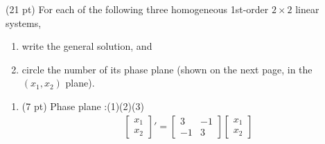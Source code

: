 (21 pt) For each of the following three homogeneous 1st-order $2 \times 2$ linear systems,
\begin{enumerate}
\item write the general solution, and
\item circle the number of its phase plane (shown on the next page, in the $(x_{1},x_{2})$ plane).
\end{enumerate}



\begin{enumerate}[label=(\alph*)]
\item\label{itm : Math211 Summer2019 Exam3 Q4a} (7 pt) Phase plane :\hspace{.65in}(1)\hspace{1in}(2)\hspace{1in}(3)
\begin{align*}
\begin{bmatrix}
x_{1}	\\
x_{2}
\end{bmatrix}%
'
=
\begin{bmatrix}
3	&	-1	\\
-1	&	3
\end{bmatrix}%
\begin{bmatrix}
x_{1}	\\
x_{2}
\end{bmatrix}%
\end{align*}
\end{enumerate}

